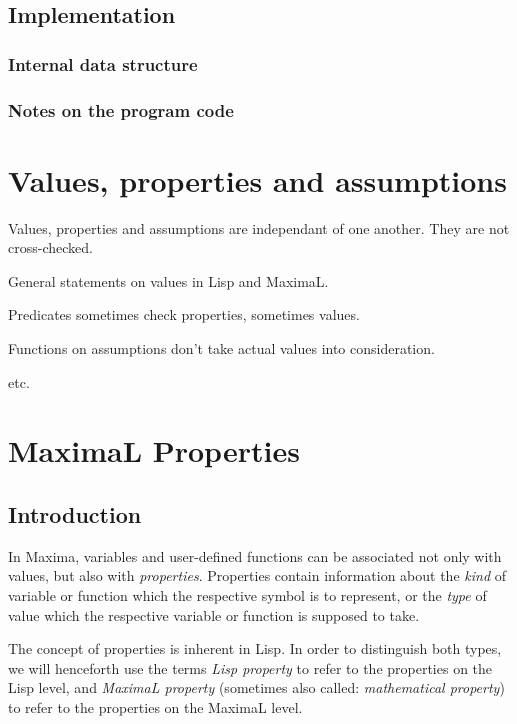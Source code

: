 \documentclass[../Maxima_Workbook.tex]{subfiles}
\begin{document}
\subsection{Implementation}

\subsubsection{Internal data structure}

\subsubsection{Notes on the program code}

\section{Values, properties and assumptions}

Values, properties and assumptions are independant of one another. They are not cross-checked.

\lz General statements on values in Lisp and MaximaL.

\lz Predicates sometimes check properties, sometimes values.

\lz Functions on assumptions don't take actual values into consideration.

\lz etc.


\section{MaximaL Properties}

\subsection{Introduction}

In Maxima, variables and user-defined functions can be associated not only with values, but also with \emph{properties}. Properties contain information about the \emph{kind} of variable or function which the respective symbol is to represent, or the \emph{type} of value which the respective variable or function is supposed to take. 

\lz The concept of properties is inherent in Lisp. In order to distinguish both types, we will henceforth use the terms \emph{Lisp property} to refer to the properties on the Lisp level, and \emph{MaximaL property} (sometimes also called: \emph{mathematical property}) to refer to the properties on the MaximaL level. 
\end{document}
